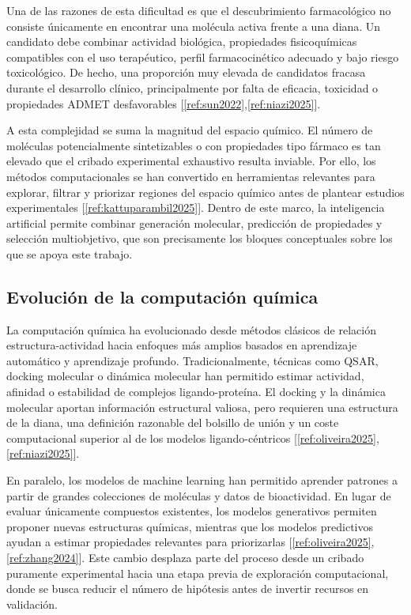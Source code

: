 \documentclass[IB]{TFUOC}%
\begin{document}
Una de las razones de esta dificultad es que el descubrimiento farmacológico no consiste únicamente en encontrar una molécula activa frente a una diana. Un candidato debe combinar actividad biológica, propiedades fisicoquímicas compatibles con el uso terapéutico, perfil farmacocinético adecuado y bajo riesgo toxicológico. De hecho, una proporción muy elevada de candidatos fracasa durante el desarrollo clínico, principalmente por falta de eficacia, toxicidad o propiedades ADMET desfavorables [\ref{ref:sun2022},\ref{ref:niazi2025}].

A esta complejidad se suma la magnitud del espacio químico. El número de moléculas potencialmente sintetizables o con propiedades tipo fármaco es tan elevado que el cribado experimental exhaustivo resulta inviable. Por ello, los métodos computacionales se han convertido en herramientas relevantes para explorar, filtrar y priorizar regiones del espacio químico antes de plantear estudios experimentales [\ref{ref:kattuparambil2025}]. Dentro de este marco, la inteligencia artificial permite combinar generación molecular, predicción de propiedades y selección multiobjetivo, que son precisamente los bloques conceptuales sobre los que se apoya este trabajo.

\subsection{Evolución de la computación química}

La computación química ha evolucionado desde métodos clásicos de relación estructura-actividad hacia enfoques más amplios basados en aprendizaje automático y aprendizaje profundo. Tradicionalmente, técnicas como QSAR, docking molecular o dinámica molecular han permitido estimar actividad, afinidad o estabilidad de complejos ligando-proteína. El docking y la dinámica molecular aportan información estructural valiosa, pero requieren una estructura de la diana, una definición razonable del bolsillo de unión y un coste computacional superior al de los modelos ligando-céntricos [\ref{ref:oliveira2025},\ref{ref:niazi2025}].

En paralelo, los modelos de machine learning han permitido aprender patrones a partir de grandes colecciones de moléculas y datos de bioactividad. En lugar de evaluar únicamente compuestos existentes, los modelos generativos permiten proponer nuevas estructuras químicas, mientras que los modelos predictivos ayudan a estimar propiedades relevantes para priorizarlas [\ref{ref:oliveira2025},\ref{ref:zhang2024}]. Este cambio desplaza parte del proceso desde un cribado puramente experimental hacia una etapa previa de exploración computacional, donde se busca reducir el número de hipótesis antes de invertir recursos en validación.
\end{document}
